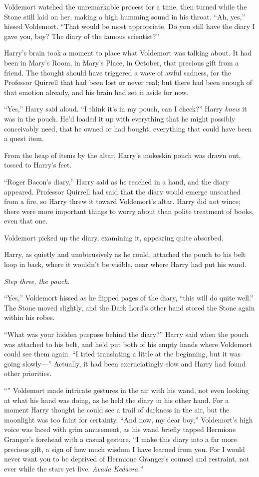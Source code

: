 Voldemort watched the unremarkable process for a time, then turned while the Stone still laid on her, making a high humming sound in his throat. “Ah, yes,” hissed Voldemort. “That would be most appropriate. Do you still have the diary I gave you, boy? The diary of the famous scientist?”

Harry’s brain took a moment to place what Voldemort was talking about. It had been in Mary’s Room, in Mary’s Place, in October, that precious gift from a friend. The thought should have triggered a wave of awful sadness, for the Professor Quirrell that had been lost or never real; but there had been enough of that emotion already, and his brain had set it aside for now.

“Yes,” Harry said aloud. “I think it’s in my pouch, can I check?” Harry \emph{knew} it was in the pouch. He’d loaded it up with everything that he might possibly conceivably need, that he owned or had bought; everything that could have been a quest item.

From the heap of items by the altar, Harry’s mokeskin pouch was drawn out, tossed to Harry’s feet.

“Roger Bacon’s diary,” Harry said as he reached in a hand, and the diary appeared. Professor Quirrell had said that the diary would emerge unscathed from a fire, so Harry threw it toward Voldemort’s altar. Harry did not wince; there were more important things to worry about than polite treatment of books, even that one.

Voldemort picked up the diary, examining it, appearing quite absorbed.

Harry, as quietly and unobtrusively as he could, attached the pouch to his belt loop in back, where it wouldn’t be visible, near where Harry had put his wand.

\emph{Step three, the pouch.}

“Yes,” Voldemort hissed as he flipped pages of the diary, “this will do quite well.” The Stone moved slightly, and the Dark Lord’s other hand stored the Stone again within his robes.

“What was your hidden purpose behind the diary?” Harry said when the pouch was attached to his belt, and he’d put both of his empty hands where Voldemort could see them again. “I tried translating a little at the beginning, but it was going slowly—” Actually, it had been excruciatingly slow and Harry had found other priorities.

“” Voldemort made intricate gestures in the air with his wand, not even looking at what his hand was doing, as he held the diary in his other hand. For a moment Harry thought he could see a trail of darkness in the air, but the moonlight was too faint for certainty. “And now, my dear boy,” Voldemort’s high voice was laced with grim amusement, as his wand briefly tapped Hermione Granger’s forehead with a casual gesture, “I make this diary into a far more precious gift, a sign of how much wisdom I have learned from you. For I would never want you to be deprived of Hermione Granger’s counsel and restraint, not ever while the stars yet live. \emph{Avada Kedavra.}”

